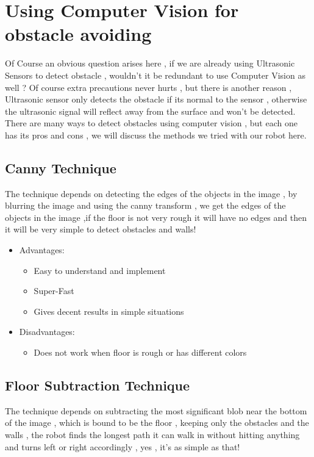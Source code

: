 \documentclass[12pt]{book}
\begin{document}
\section{Using Computer Vision for obstacle avoiding}
Of Course an obvious question arises here , if we are already using Ultrasonic Sensors to detect obstacle , wouldn’t it be redundant to use Computer Vision as well ? Of course extra precautions never hurts , but there is another reason , Ultrasonic sensor only detects the obstacle if its normal to the sensor , otherwise the ultrasonic signal will reflect away from the surface and won’t be detected.\\

\noindent There are many ways to detect obstacles using computer vision , but each one has its pros and cons , we will discuss the methods we tried with our robot here.

\subsection{Canny Technique}
The technique depends on detecting the edges of the objects in the image , by blurring the image and using the canny transform , we get the edges of the objects in the image ,if the floor is not very rough it will have no edges and then it will be very simple to detect obstacles and walls!\\

\begin{itemize}
	\item Advantages:
	\begin{itemize}
		\item Easy to understand and implement 
		\item Super-Fast
		\item Gives decent results in simple situations
	\end{itemize}
	\item Disadvantages:
	\begin{itemize}
		\item Does not work when floor is rough or has different colors 
	\end{itemize}
\end{itemize}

\subsection{Floor Subtraction Technique}
The technique depends on subtracting the most significant blob near the bottom of the image , which is bound to be the floor , keeping only the obstacles and the walls , the robot finds the longest path it can walk in without hitting anything and turns left or right accordingly , yes , it’s as simple as that!
\end{document}
